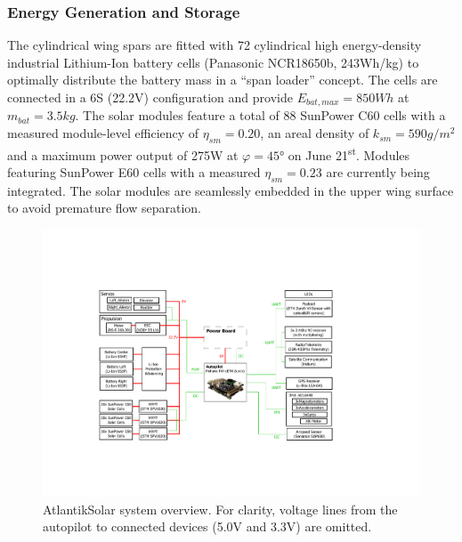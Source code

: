 \subsubsection{Energy Generation and Storage}
The cylindrical wing spars are fitted with 72 cylindrical high energy-density industrial Lithium-Ion battery cells (Panasonic NCR18650b, 243Wh/kg) to optimally distribute the battery mass in a ``span loader'' concept. The cells are connected in a 6S (22.2V) configuration and provide $E_{bat,max}=850Wh$ at $m_{bat}=3.5kg$. The solar modules feature a total of 88 SunPower C60 cells with a measured module-level efficiency of $\eta_{sm}=0.20$, an areal density of $k_{sm}=590g/m^2$ and a maximum power output of 275W at $\varphi=45°$ on June 21\textsuperscript{st}. Modules featuring SunPower E60 cells with a measured \cite{Sunier_EPFLSolarModules} $\eta_{sm}=0.23$ are currently being integrated. The solar modules are seamlessly embedded in the upper wing surface to avoid premature flow separation.

\begin{figure}[tb]
    \centering
     \includegraphics[width=\linewidth]{images/8_AtlantikSolar_Avionics}
    \caption{AtlantikSolar system overview. For clarity, voltage lines from the autopilot to connected devices (5.0V and 3.3V) are omitted.}
    \label{fig:AtlantikSolar_SystemOverview}
\end{figure}


